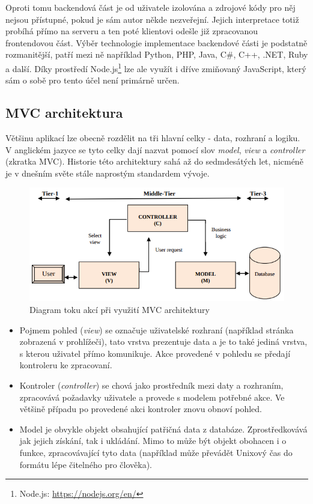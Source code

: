 Oproti tomu backendová část je od uživatele izolována a zdrojové kódy pro něj nejsou přístupné, pokud je sám autor někde nezveřejní. Jejich interpretace totiž probíhá přímo na serveru a ten poté klientovi odešle již zpracovanou frontendovou část. Výběr technologie implementace backendové části je podstatně rozmanitější, patří mezi ně například Python, PHP, Java, C#, C++, .NET, Ruby a další. Díky prostředí Node.js\footnote{Node.js: \url{https://nodejs.org/en/}} lze ale využít i dříve zmiňovaný JavaScript, který sám o sobě pro tento účel není primárně určen. 

\subsection{MVC architektura}
Většinu aplikací lze obecně rozdělit na tři hlavní celky - data, rozhraní a logiku. V anglickém jazyce se tyto celky dají nazvat pomocí slov \emph{model}, \emph{view} a \emph{controller} (zkratka MVC). Historie této architektury sahá až do sedmdesátých let, nicméně je v dnešním světe stále naprostým standardem vývoje.

\begin{figure}[H]
	\centering
	\includegraphics[width=\textwidth]{images/mvc.png}
	\caption{Diagram toku akcí při využití MVC architektury}
	\label{mvc}
\end{figure}

\begin{itemize}
\item Pojmem pohled (\emph{view}) se označuje uživatelské rozhraní (například stránka zobrazená v prohlížeči), tato vrstva prezentuje data a je to také jediná vrstva, s kterou uživatel přímo komunikuje. Akce provedené v pohledu se předají kontroleru ke zpracovaní.
\item Kontroler (\emph{controller}) se chová jako prostředník mezi daty a rozhraním, zpracovává požadavky uživatele a provede s modelem potřebné akce. Ve většině případu po provedené akci kontroler znovu obnoví pohled.
\item Model je obvykle objekt obsahující patřičná data z databáze. Zprostředkovává jak jejich získání, tak i ukládání. Mimo to může být objekt obohacen i o funkce, zpracovávající tyto data (například může převádět Unixový čas do formátu lépe čitelného pro člověka). 
\end{itemize}


